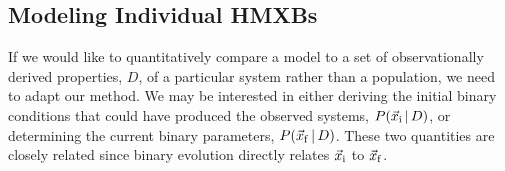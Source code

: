 \documentclass[usenatbib]{mnras}
\newcommand{\given}{\,|\,}
\begin{document}









\subsection{Modeling Individual HMXBs} \label{sec:stats_individual}

If we would like to quantitatively compare a model to a set of observationally derived properties, $D$, of a particular system rather than a population, we need to adapt our method. We may be interested in either deriving the initial binary conditions that could have produced the observed systems, $P(\vec{x}_{\rm i} \given D)$, or determining the current binary parameters, $P(\vec{x}_{\rm f} \given D)$. These two quantities are closely related since binary evolution directly relates $\vec{x}_{\rm i}$ to $\vec{x}_{\rm f}$. 
\end{document}
